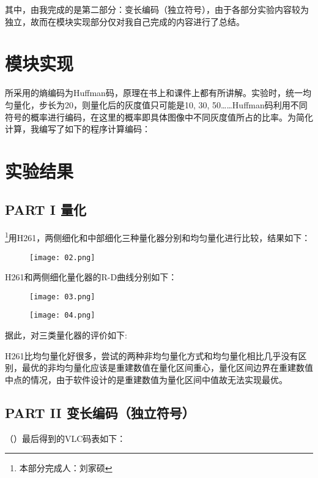 \documentclass[UTF8]{ctexart}
\begin{document}
其中，由我完成的是第二部分：变长编码（独立符号），由于各部分实验内容较为独立，故而在模块实现部分仅对我自己完成的内容进行了总结。

\section{模块实现}

所采用的熵编码为Huffman码，原理在书上和课件上都有所讲解。实验时，统一均匀量化，步长为20，则量化后的灰度值只可能是10, 30, 50……Huffman码利用不同符号的概率进行编码，在这里的概率即具体图像中不同灰度值所占的比率。为简化计算，我编写了如下的程序计算编码：



\section{实验结果}

\subsection{PART I 量化}

\footnote{本部分完成人：刘家硕}用H261，两侧细化和中部细化三种量化器分别和均匀量化进行比较，结果如下：
\begin{figure}[H]
    \centering
    \texttt{[image: 02.png]}
\end{figure}

H261和两侧细化量化器的R-D曲线分别如下：
\begin{figure}[H]
    \centering
    \texttt{[image: 03.png]}
\end{figure}

\begin{figure}[H]
    \centering
    \texttt{[image: 04.png]}
\end{figure}

据此，对三类量化器的评价如下:

H261比均匀量化好很多，尝试的两种非均匀量化方式和均匀量化相比几乎没有区别，最优的非均匀量化应该是重建数值在量化区间重心，量化区间边界在重建数值中点的情况，由于软件设计的是重建数值为量化区间中值故无法实现最优。

\subsection{PART II 变长编码（独立符号）}

（）最后得到的VLC码表如下：
\end{document}
